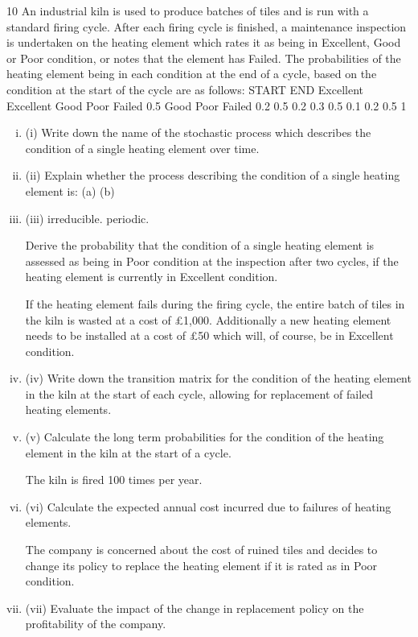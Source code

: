 \documentclass[a4paper,12pt]{article}
\begin{document}
\begin{enumerate}
10
An industrial kiln is used to produce batches of tiles and is run with a standard firing cycle. After each firing cycle is finished, a maintenance inspection is undertaken on the heating element which rates it as being in Excellent, Good or Poor condition, or
notes that the element has Failed.
The probabilities of the heating element being in each condition at the end of a cycle,
based on the condition at the start of the cycle are as follows:
START
END
Excellent
Excellent
Good
Poor
Failed
0.5
Good Poor Failed
0.2
0.5 0.2
0.3
0.5 0.1
0.2
0.5
1

\begin{enumerate}[(i)]
\item (i) Write down the name of the stochastic process which describes the condition of a single heating element over time.

\item (ii) Explain whether the process describing the condition of a single heating
element is:
(a)
(b)
\item (iii)
irreducible.
periodic.

Derive the probability that the condition of a single heating element is assessed as being in Poor condition at the inspection after two cycles, if the heating element is currently in Excellent condition.

If the heating element fails during the firing cycle, the entire batch of tiles in the kiln is wasted at a cost of £1,000. Additionally a new heating element needs to be installed at a cost of £50 which will, of course, be in Excellent condition.
\item (iv) Write down the transition matrix for the condition of the heating element in the kiln at the start of each cycle, allowing for replacement of failed heating elements.
\item (v) Calculate the long term probabilities for the condition of the heating element in the kiln at the start of a cycle.

The kiln is fired 100 times per year.
\item (vi)
Calculate the expected annual cost incurred due to failures of heating
elements.

The company is concerned about the cost of ruined tiles and decides to change its policy to replace the heating element if it is rated as in Poor condition.
\item (vii)
Evaluate the impact of the change in replacement policy on the profitability of
the company.
\end{enumerate}
\newpage


\end{enumerate}
\end{document}
